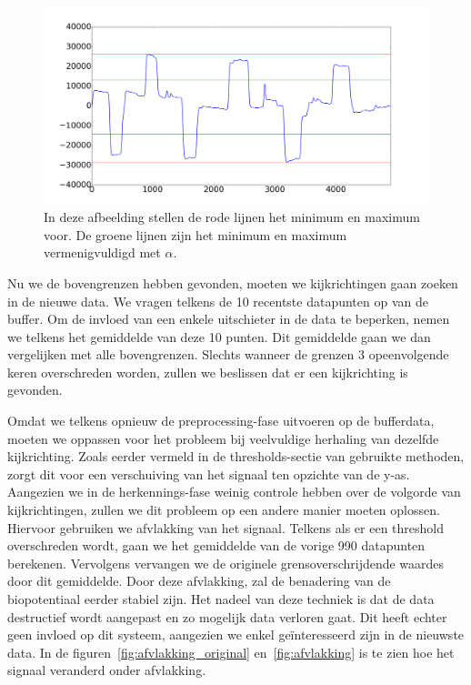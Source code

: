 \documentclass{article}
\begin{document}
\begin{figure}[h]
\centering
\includegraphics[width=\linewidth]{images/thresholds_distribution}
\caption{In deze afbeelding stellen de rode lijnen het minimum en maximum voor. De groene lijnen zijn het minimum en maximum vermenigvuldigd met $\alpha$.}
\label{fig:maxminthresholds}
\end{figure}

Nu we de bovengrenzen hebben gevonden, moeten we kijkrichtingen gaan zoeken in de nieuwe data. We vragen telkens de 10 recentste datapunten op van de buffer. Om de invloed van een enkele uitschieter in de data te beperken, nemen we telkens het gemiddelde van deze 10 punten. Dit gemiddelde gaan we dan vergelijken met alle bovengrenzen. Slechts wanneer de grenzen 3 opeenvolgende keren overschreden worden, zullen we beslissen dat er een kijkrichting is gevonden.

Omdat we telkens opnieuw de preprocessing-fase uitvoeren op de bufferdata, moeten we oppassen voor het probleem bij veelvuldige herhaling van dezelfde kijkrichting. Zoals eerder vermeld in de thresholds-sectie van gebruikte methoden, zorgt dit voor een verschuiving van het signaal ten opzichte van de y-as. Aangezien we in de herkennings-fase weinig controle hebben over de volgorde van kijkrichtingen, zullen we dit probleem op een andere manier moeten oplossen. Hiervoor gebruiken we afvlakking van het signaal. Telkens als er een threshold overschreden wordt, gaan we het gemiddelde van de vorige 990 datapunten berekenen. Vervolgens vervangen we de originele grensoverschrijdende waardes door dit gemiddelde. Door deze afvlakking, zal de benadering van de biopotentiaal eerder stabiel zijn. Het nadeel van deze techniek is dat de data destructief wordt aangepast en zo mogelijk data verloren gaat. Dit heeft echter geen invloed op dit systeem, aangezien we enkel geïnteresseerd zijn in de nieuwste data. In de figuren~\ref{fig:afvlakking_original} en~\ref{fig:afvlakking} is te zien hoe het signaal veranderd onder afvlakking.
\end{document}
